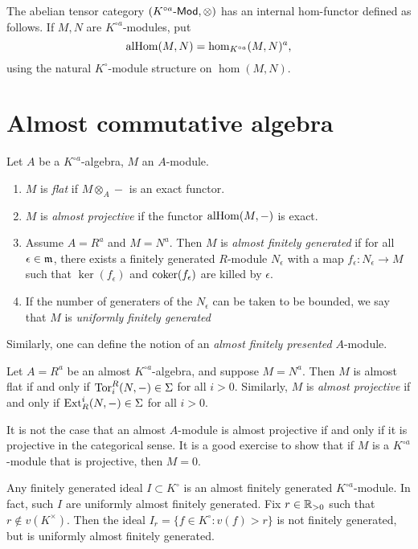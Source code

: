 \documentclass{article}
\begin{document}
The abelian tensor category $(K^{\circ a}\text{-}\mathsf{Mod},\otimes)$ has an internal 
hom-functor defined as follows. If $M,N$ are $K^{\circ a}$-modules, put 
\[
  \operatorname{alHom}(M,N) = \hom_{K^{\circ a}}(M,N)^a \text{,}
\]
using the natural $K^\circ$-module structure on $\hom(M,N)$. 





\section{Almost commutative algebra}

\begin{definition}
Let $A$ be a $K^{\circ a}$-algebra, $M$ an $A$-module. 
\begin{enumerate}
  \item $M$ is \emph{flat} if $M\otimes_A -$ is an exact functor. 
  \item $M$ is \emph{almost projective} if the functor $\operatorname{alHom}(M,-)$ is exact. 
  \item Assume $A=R^a$ and $M=N^a$. Then $M$ is \emph{almost finitely generated} 
    if for all $\epsilon\in \mathfrak{m}$, there exists a finitely generated 
    $R$-module $N_\epsilon$ with a map $f_\epsilon:N_\epsilon\to M$ such that 
    $\ker(f_\epsilon)$ and $\operatorname{coker}(f_\epsilon)$ are killed by $\epsilon$. 
  \item If the number of generaters of the $N_\epsilon$ can be taken to be 
    bounded, we say that $M$ is \emph{uniformly finitely generated}
\end{enumerate}
\end{definition}
Similarly, one can define the notion of an \emph{almost finitely presented} 
$A$-module. 

Let $A=R^a$ be an almost $K^{\circ a}$-algebra, and suppose $M=N^a$. Then $M$ is 
almost flat if and only if $\operatorname{Tor}_i^R(N,-)\in\Sigma$ for all $i>0$. Similarly, 
$M$ is \emph{almost projective} if and only if $\operatorname{Ext}_R^i(N,-)\in \Sigma$ for all 
$i>0$. 

It is not the case that an almost $A$-module is almost projective if and only if 
it is projective in the categorical sense. It is a good exercise to show that if 
$M$ is a $K^{\circ a}$-module that is projective, then $M=0$. 

Any finitely generated ideal $I\subset K^\circ$ is an almost finitely generated 
$K^{\circ a}$-module. In fact, such $I$ are uniformly almost finitely generated. 
Fix $r\in \mathbb{R}_{>0}$ such that $r\notin v(K^\times)$. Then the ideal 
$I_r=\{f\in K^\circ:v(f)>r\}$ is not finitely generated, but is uniformly almost 
finitely generated. 
\end{document}
